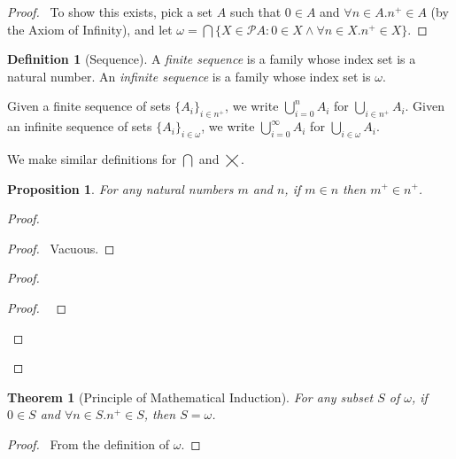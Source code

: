 \documentclass{report}
\let\qed\relax
\newtheorem{prop}[ax]{Proposition}
\newtheorem{thm}[ax]{Theorem}
\theoremstyle{definition}
\newtheorem{df}[ax]{Definition}
\begin{document}
\begin{proof}
\pf\ To show this exists, pick a set $A$ such that $0 \in A$ and $\forall n \in A. n^+ \in A$ (by the Axiom of Infinity), and let $\omega = \bigcap \{ X \in \mathcal{P} A : 0 \in X \wedge \forall n \in X. n^+ \in X \}$. \qed
\end{proof}

\begin{df}[Sequence]
A \emph{finite sequence} is a family whose index set is a natural number. An \emph{infinite sequence} is a family whose index set is $\omega$.

Given a finite sequence of sets $\{ A_i \}_{i \in n^+}$, we write $\bigcup_{i=0}^n A_i$ for $\bigcup_{i \in n^+} A_i$. Given an infinite sequence of sets $\{ A_i \}_{i \in \omega}$, we write $\bigcup_{i=0}^\infty A_i$ for $\bigcup_{i \in \omega} A_i$.

We make similar definitions for $\bigcap$ and $\bigtimes$.
\end{df}

\begin{prop}
\label{prop:succ_in_succ}
For any natural numbers $m$ and $n$, if $m \in n$ then $m^+ \in n^+$.
\end{prop}

\begin{proof}
\pf
{}
\begin{proof}
	\pf\ Vacuous.
\end{proof}
\begin{proof}
	\begin{proof}
		\pf\ 
	\end{proof}
\end{proof}
\qed
\end{proof}

\begin{thm}[Principle of Mathematical Induction]
For any subset $S$ of $\omega$, if $0 \in S$ and $\forall n \in S. n^+ \in S$, then $S = \omega$.
\end{thm}

\begin{proof}
\pf\ From the definition of $\omega$. \qed
\end{proof}
\end{document}
